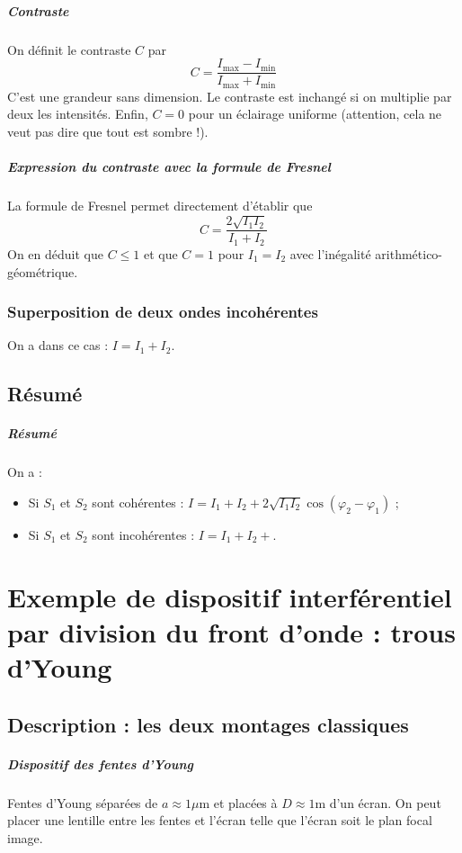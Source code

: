 \documentclass[french]{book}
\theoremstyle{plain}
\theoremstyle{definition}
\theoremstyle{remark}
\begin{document}
\paragraph{Contraste} On définit le contraste $C$ par $$C=\frac{I_\text{max}-I_\text{min}}{I_\text{max}+I_\text{min}}$$ C'est une grandeur sans dimension. Le contraste est inchangé si on multiplie par deux les intensités. Enfin, $C=0$ pour un éclairage uniforme (attention, cela ne veut pas dire que tout est sombre !).
\paragraph{Expression du contraste avec la formule de Fresnel} La formule de Fresnel permet directement d'établir que $$C=\frac{2\sqrt{I_1I_2}}{I_1+I_2}$$ On en déduit que $C\leqslant 1$ et que $C=1$ pour $I_1=I_2$ avec l'inégalité arithmético-géométrique.
\subsection{Superposition de deux ondes incohérentes}
On a dans ce cas : $I=I_1+I_2$.
\section{Résumé}
\paragraph{Résumé}
On a :
\begin{itemize}
	\item Si $S_1$ et $S_2$ sont cohérentes : $I=I_1+I_2+2\sqrt{I_1I_2}\cos(\varphi_2-\varphi_1)$ ;
	\item Si $S_1$ et $S_2$ sont incohérentes : $I=I_1+I_2+$.
\end{itemize}


\chapter{Exemple de dispositif interférentiel par division du front d'onde : trous d'Young}
\localtableofcontents
\section{Description : les deux montages classiques}
\paragraph{Dispositif des fentes d'Young} Fentes d'Young séparées de $a\approx 1\mu$m et placées à $D\approx1$m d’un écran. On peut placer une lentille entre les fentes et l’écran telle que l’écran soit le plan focal image.
\end{document}
